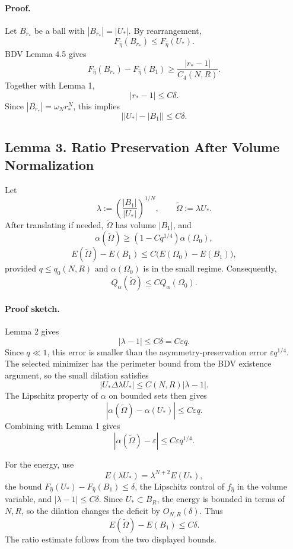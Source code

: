 \documentclass[11pt]{article}
\begin{document}
\paragraph{Proof.}
Let \(B_{r_*}\) be a ball with \(|B_{r_*}|=|U_*|\). By rearrangement,
\[
F_{\hat\eta}(B_{r_*})\le F_{\hat\eta}(U_*).
\]
BDV Lemma 4.5 gives
\[
F_{\hat\eta}(B_{r_*})-F_{\hat\eta}(B_1)
\ge
\frac{|r_*-1|}{C_4(N,R)}.
\]
Together with Lemma 1,
\[
|r_*-1|\le C\delta.
\]
Since \(|B_{r_*}|=\omega_N r_*^N\), this implies
\[
\bigl||U_*|-|B_1|\bigr|\le C\delta.
\]

\subsection*{Lemma 3. Ratio Preservation After Volume Normalization}

Let
\[
\lambda:=\left(\frac{|B_1|}{|U_*|}\right)^{1/N},
\qquad
\widetilde\Omega:=\lambda U_*.
\]
After translating if needed, \(\widetilde\Omega\) has volume \(|B_1|\), and
\[
\alpha(\widetilde\Omega)
\ge
\left(1-Cq^{1/4}\right)\alpha(\Omega_0),
\]
\[
E(\widetilde\Omega)-E(B_1)
\le
C\big(E(\Omega_0)-E(B_1)\big),
\]
provided \(q\le q_0(N,R)\) and \(\alpha(\Omega_0)\) is in the small regime.
Consequently,
\[
Q_\alpha(\widetilde\Omega)
\le
C Q_\alpha(\Omega_0).
\]

\paragraph{Proof sketch.}
Lemma 2 gives
\[
|\lambda-1|\le C\delta=C\varepsilon q.
\]
Since \(q\ll1\), this error is smaller than the asymmetry-preservation error
\(\varepsilon q^{1/4}\). The selected minimizer has the perimeter bound from
the BDV existence argument, so the small dilation satisfies
\[
|U_*\Delta \lambda U_*|
\le C(N,R)|\lambda-1|.
\]
The Lipschitz property of \(\alpha\) on bounded sets then gives
\[
|\alpha(\widetilde\Omega)-\alpha(U_*)|
\le C\varepsilon q.
\]
Combining with Lemma 1 gives
\[
|\alpha(\widetilde\Omega)-\varepsilon|
\le C\varepsilon q^{1/4}.
\]

For the energy, use
\[
E(\lambda U_*)=\lambda^{N+2}E(U_*),
\]
the bound \(F_{\hat\eta}(U_*)-F_{\hat\eta}(B_1)\le\delta\), the Lipschitz
control of \(f_{\hat\eta}\) in the volume variable, and
\(|\lambda-1|\le C\delta\). Since \(U_*\subset B_R\), the energy is bounded in
terms of \(N,R\), so the dilation changes the deficit by \(O_{N,R}(\delta)\).
Thus
\[
E(\widetilde\Omega)-E(B_1)\le C\delta.
\]
The ratio estimate follows from the two displayed bounds.
\end{document}
